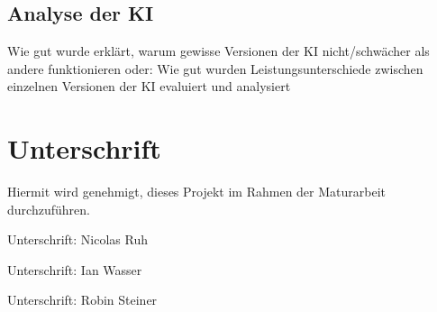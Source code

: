 \documentclass{article}
\begin{document}
\subsection{Analyse der KI}
\label{chap:erklaerung}
Wie gut wurde erklärt, warum gewisse Versionen der KI nicht/schwächer als andere funktionieren
oder:
Wie gut wurden Leistungsunterschiede zwischen einzelnen Versionen der KI evaluiert und analysiert




\section{Unterschrift}
\label{chap:unterschrift}

Hiermit wird genehmigt, dieses Projekt im Rahmen der Maturarbeit
durchzuführen.

\vspace*{1cm}

Unterschrift: \hrulefill Nicolas Ruh \vspace*{2cm}

Unterschrift: \hrulefill Ian Wasser \vspace*{2cm}

Unterschrift: \hrulefill Robin Steiner \vspace*{2cm}

\printbibliography[heading=bibintoc]
\end{document}
